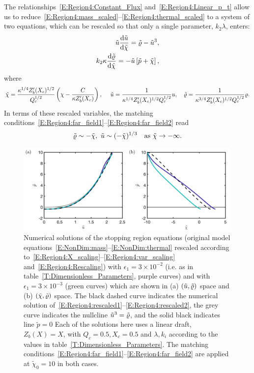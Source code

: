 \documentclass[openacc]{rsproca_new}%
\newcommand{\dd}[2]{\frac{\mathrm{d} #1}{\mathrm{d} #2}}
\newcommand{\epsone}{\epsilon_{1}} %
\begin{document}
The relationships~\eqref{E:Region4:Constant_Flux} and~\eqref{E:Region4:Linear_p_t} allow us to reduce~\eqref{E:Region4:mass_scaled}--\eqref{E:Region4:thermal_scaled} to a system of two equations, which can be rescaled so that only a single parameter, $k_2 \lambda$, enters:
\begin{align}
\tilde{u} \dd{\tilde{u}}{\tilde{\chi}} = \tilde{\p} - \tilde{u}^3,\label{E:Region4:rescaled1}\\
k_2 \lambda \dd{\tilde{\p}}{\tilde{\chi}} = -\tilde{u}\left[\tilde{p} + \tilde{\chi}\right],\label{E:Region4:rescaled2}
\end{align}
where
\begin{equation}\label{E:Region4:Rescaling}
\tilde{\chi} = \frac{\kappa^{1/4}Z_b'(X_c)^{1/2}}{Q_c^{1/2}}\left(\chi - \frac{C}{\kappa Z_b'(X_c)}\right), ~\quad  \tilde{u} = \frac{1}{\kappa^{1/4}Z_b'(X_c)^{1/2}Q_c^{1/2}}u,\quad \tilde{\varrho}= \frac{1}{\kappa^{3/4}Z_b'(X_c)^{ 1/2}Q_c^{1/2}}\varrho.
\end{equation} 
In terms of these rescaled variables, the matching conditions~\eqref{E:Region4:far_field1}--\eqref{E:Region4:far_field2} read
\begin{equation}\label{E:Region4:Rescaled_farfield}
\tilde{\varrho} \sim -\tilde{\chi},~ \tilde{u}\sim (-\tilde{\chi})^{1/3}\quad \text{as}~\tilde{\chi}\to -\infty.
\end{equation}


\begin{figure}
\centering
\includegraphics[width = 0.99\textwidth]{Submitted_PRSA/make_plots/plots/figure5.png}
\caption{Numerical solutions of the stopping region equations (original model equations~\eqref{E:NonDim:mass}--\eqref{E:NonDim:thermal} rescaled according to~\eqref{E:Region4:X_scaling}--\eqref{E:Region4:var_scaling} and~\eqref{E:Region4:Rescaling}) with $\epsone = 3\times 10^{-2}$ (i.e. as in table~\ref{T:Dimensionless_Parameters}, purple curves) and with $\epsone = 3\times 10^{-3}$ (green curves) which are shown in (a) $(\tilde{u}, \tilde{\varrho})$ space and (b) $(\tilde{\chi}, \tilde{\varrho})$ space. The black dashed curve indicates the numerical solution of~\eqref{E:Region4:rescaled1}--\eqref{E:Region4:rescaled2}, the grey curve indicates the nullcline $\tilde{u}^3 = \tilde{\varrho}$, and the solid black indicates line $\tilde{p} = 0$ Each of the solutions here uses a linear draft, $Z_b(X) = X$, with $Q_c = 0.5, X_c = 0.5$ and $\lambda, k_i$ according to the values in table~\ref{T:Dimensionless_Parameters}. The matching conditions~\eqref{E:Region4:far_field1}--\eqref{E:Region4:far_field2} are applied at $\tilde{\chi}_0 = 10$ in both cases. }\label{fig:Region4}
\end{figure}
\end{document}
